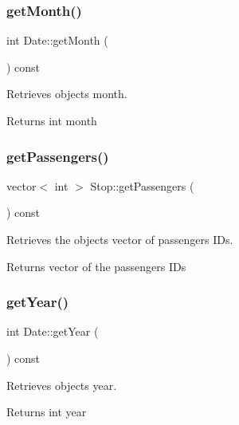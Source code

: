 \subsubsection{\texorpdfstring{get\+Month()}{getMonth()}}
{\footnotesize\ttfamily int Date\+::get\+Month (\begin{DoxyParamCaption}{ }\end{DoxyParamCaption}) const}



Retrieves object\textquotesingle{}s month. 

\begin{DoxyReturn}{Returns}
int month 
\end{DoxyReturn}
\mbox{\label{group___date_gabd197ec53b1215bed050d879d463e987}} 
\subsubsection{\texorpdfstring{get\+Passengers()}{getPassengers()}}
{\footnotesize\ttfamily vector$<$ int $>$ Stop\+::get\+Passengers (\begin{DoxyParamCaption}{ }\end{DoxyParamCaption}) const}



Retrieves the object\textquotesingle{}s vector of passengers I\+Ds. 

\begin{DoxyReturn}{Returns}
vector of the passengers I\+Ds 
\end{DoxyReturn}
\mbox{\label{group___date_ga8b0869f34c2b38d108ab83ee2e770e5d}} 
\subsubsection{\texorpdfstring{get\+Year()}{getYear()}}
{\footnotesize\ttfamily int Date\+::get\+Year (\begin{DoxyParamCaption}{ }\end{DoxyParamCaption}) const}



Retrieves object\textquotesingle{}s year. 

\begin{DoxyReturn}{Returns}
int year 
\end{DoxyReturn}
\mbox{\label{group___date_ga2f97b9d1ac5ef0ef6b6cab3335c5303d}} 
